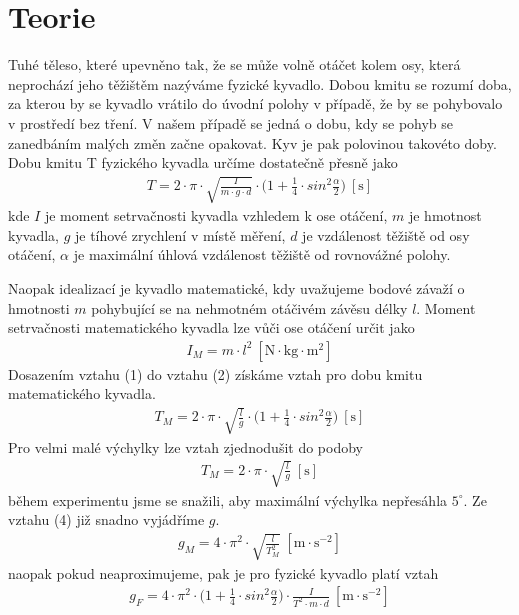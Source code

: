 \documentclass{article}
\begin{document}
\section*{Teorie}
Tuhé těleso, které upevněno tak, že se může volně otáčet kolem osy, která neprochází jeho těžištěm nazýváme fyzické kyvadlo. Dobou kmitu se rozumí doba, za kterou by se kyvadlo vrátilo do úvodní polohy v případě, že by se pohybovalo v prostředí bez tření. V našem případě se jedná o dobu, kdy se pohyb se zanedbáním malých změn začne opakovat. Kyv je pak polovinou takovéto doby. Dobu kmitu T fyzického kyvadla určíme dostatečně přesně jako
\begin{align}
T=2 \cdot \pi \cdot \sqrt{\frac{I}{m \cdot g \cdot d}} \cdot \Bigg(1 + \frac{1}{4} \cdot sin^{2}\frac{\alpha}{2}\Bigg)\: \mathrm{[s]}
\end{align}
kde $I$ je moment setrvačnosti kyvadla vzhledem k ose otáčení, $m$ je hmotnost kyvadla, $g$ je tíhové zrychlení v místě měření, $d$ je vzdálenost těžiště od osy otáčení, $\alpha$ je maximální úhlová vzdálenost těžiště od rovnovážné polohy. 
\par Naopak idealizací je kyvadlo matematické, kdy uvažujeme bodové závaží o hmotnosti $m$ pohybující se na nehmotném otáčivém závěsu délky $l$. Moment setrvačnosti matematického kyvadla lze vůči ose otáčení určit jako
\begin{align}
I_{M} = m \cdot l^{2}\: \mathrm{[N \cdot kg \cdot m^{2}]}
\end{align}
Dosazením vztahu (1) do vztahu (2) získáme vztah pro dobu kmitu matematického kyvadla.
\begin{align}
T_{M} =2 \cdot \pi \cdot \sqrt{\frac{l}{g}} \cdot \Bigg(1 + \frac{1}{4} \cdot sin^{2}\frac{\alpha}{2}\Bigg)\: \mathrm{[s]}
\end{align}
Pro velmi malé výchylky lze vztah zjednodušit do podoby
\begin{align}
T_{M} = 2 \cdot \pi \cdot \sqrt{\frac{l}{g}}\: \mathrm{[s]}
\end{align}
během experimentu jsme se snažili, aby maximální výchylka nepřesáhla $5^{\circ}$. Ze vztahu (4) již snadno vyjádříme $g$.
\begin{align}
g_{M} = 4 \cdot \pi^{2} \cdot \sqrt{\frac{l}{T_{M}^{2}}}\: \mathrm{[m \cdot s^{-2}]}
\end{align}
naopak pokud neaproximujeme, pak je pro fyzické kyvadlo platí vztah
\begin{align}
g_{F} = 4 \cdot \pi^{2} \cdot \Bigg(1 + \frac{1}{4} \cdot sin^{2}\frac{\alpha}{2}\Bigg) \cdot \frac{I}{T^{2}\cdot m \cdot d}\: \mathrm{[m \cdot s^{-2}]}
\end{align}
\end{document}
